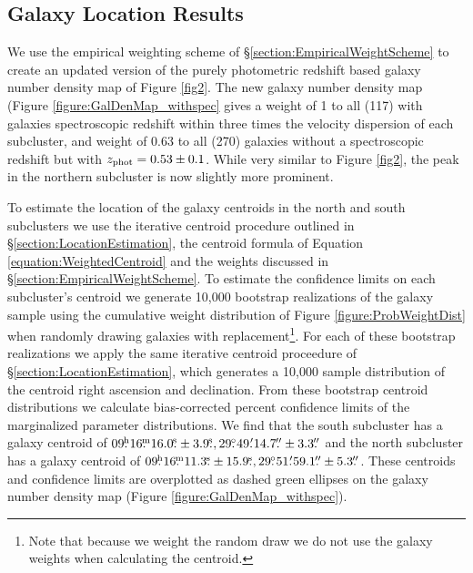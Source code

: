 \subsection{Galaxy Location Results}

We use the empirical weighting scheme of \S\ref{section:EmpiricalWeightScheme} to create an updated version of the purely photometric redshift based galaxy number density map of Figure \ref{fig2}.
The new galaxy number density map (Figure \ref{figure:GalDenMap_withspec} gives a weight of 1 to all (117) with galaxies spectroscopic redshift within three times the velocity dispersion of each subcluster, and  weight of 0.63 to all (270) galaxies without a spectroscopic redshift but with $z_{\rm phot}=0.53\pm0.1$.
While very similar to Figure \ref{fig2}, the peak in the northern subcluster is now slightly more prominent.

To estimate the location of the galaxy centroids in the north and south subclusters we use the iterative centroid procedure outlined in \S\ref{section:LocationEstimation}, the centroid formula of Equation \ref{equation:WeightedCentroid} and the weights discussed in \S\ref{section:EmpiricalWeightScheme}.
To estimate the confidence limits on each subcluster's centroid we generate 10,000 bootstrap realizations of the galaxy sample using the cumulative weight distribution of Figure \ref{figure:ProbWeightDist} when randomly drawing galaxies with replacement\footnote{Note that because we weight the random draw we do not use the galaxy weights when calculating the centroid.}.
For each of these bootstrap realizations we apply the same iterative centroid proceedure of \S\ref{section:LocationEstimation}, which generates a 10,000 sample distribution of the centroid right ascension and declination.
From these bootstrap centroid distributions we calculate bias-corrected percent confidence limits \citep{Beers:1990kg} of the marginalized parameter distributions.
We find that the south subcluster has a galaxy centroid of $09\fh16\fm16.0\fs\pm3.9\fs, 29\fdg49\farcm14.7\farcs\pm3.3\farcs$ and the north subcluster has a galaxy centroid of $09\fh16\fm11.3\fs\pm15.9\fs, 29\fdg51\farcm59.1\farcs\pm5.3\farcs$.
These centroids and confidence limits are overplotted as dashed green ellipses on the galaxy number density map (Figure \ref{figure:GalDenMap_withspec}). 

